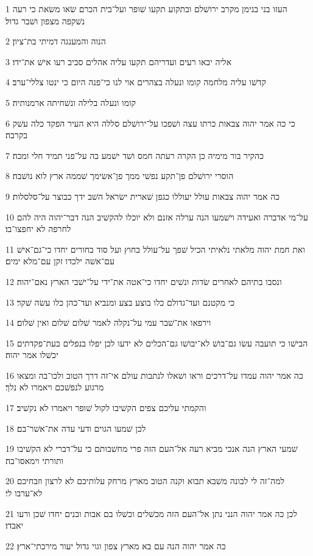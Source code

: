 \par 1 העזו בני בנימן מקרב ירושׁלם ובתקוע תקעו שׁופר ועל־בית הכרם שׂאו משׂאת כי רעה נשׁקפה מצפון ושׁבר גדול׃
\par 2 הנוה והמענגה דמיתי בת־ציון׃
\par 3 אליה יבאו רעים ועדריהם תקעו עליה אהלים סביב רעו אישׁ את־ידו׃
\par 4 קדשׁו עליה מלחמה קומו ונעלה בצהרים אוי לנו כי־פנה היום כי ינטו צללי־ערב׃
\par 5 קומו ונעלה בלילה ונשׁחיתה ארמנותיה׃
\par 6 כי כה אמר יהוה צבאות כרתו עצה ושׁפכו על־ירושׁלם סללה היא העיר הפקד כלה עשׁק בקרבה׃
\par 7 כהקיר בור מימיה כן הקרה רעתה חמס ושׁד ישׁמע בה על־פני תמיד חלי ומכה׃
\par 8 הוסרי ירושׁלם פן־תקע נפשׁי ממך פן־אשׂימך שׁממה ארץ לוא נושׁבה׃
\par 9 כה אמר יהוה צבאות עולל יעוללו כגפן שׁארית ישׂראל השׁב ידך כבוצר על־סלסלות׃
\par 10 על־מי אדברה ואעידה וישׁמעו הנה ערלה אזנם ולא יוכלו להקשׁיב הנה דבר־יהוה היה להם לחרפה לא יחפצו־בו׃
\par 11 ואת חמת יהוה מלאתי נלאיתי הכיל שׁפך על־עולל בחוץ ועל סוד בחורים יחדו כי־גם־אישׁ עם־אשׁה ילכדו זקן עם־מלא ימים׃
\par 12 ונסבו בתיהם לאחרים שׂדות ונשׁים יחדו כי־אטה את־ידי על־ישׁבי הארץ נאם־יהוה׃
\par 13 כי מקטנם ועד־גדולם כלו בוצע בצע ומנביא ועד־כהן כלו עשׂה שׁקר׃
\par 14 וירפאו את־שׁבר עמי על־נקלה לאמר שׁלום שׁלום ואין שׁלום׃
\par 15 הבישׁו כי תועבה עשׂו גם־בושׁ לא־יבושׁו גם־הכלים לא ידעו לכן יפלו בנפלים בעת־פקדתים יכשׁלו אמר יהוה׃
\par 16 כה אמר יהוה עמדו על־דרכים וראו ושׁאלו לנתבות עולם אי־זה דרך הטוב ולכו־בה ומצאו מרגוע לנפשׁכם ויאמרו לא נלך׃
\par 17 והקמתי עליכם צפים הקשׁיבו לקול שׁופר ויאמרו לא נקשׁיב׃
\par 18 לכן שׁמעו הגוים ודעי עדה את־אשׁר־בם׃
\par 19 שׁמעי הארץ הנה אנכי מביא רעה אל־העם הזה פרי מחשׁבותם כי על־דברי לא הקשׁיבו ותורתי וימאסו־בה׃
\par 20 למה־זה לי לבונה משׁבא תבוא וקנה הטוב מארץ מרחק עלותיכם לא לרצון וזבחיכם לא־ערבו לי׃
\par 21 לכן כה אמר יהוה הנני נתן אל־העם הזה מכשׁלים וכשׁלו בם אבות ובנים יחדו שׁכן ורעו יאבדו׃
\par 22 כה אמר יהוה הנה עם בא מארץ צפון וגוי גדול יעור מירכתי־ארץ׃
